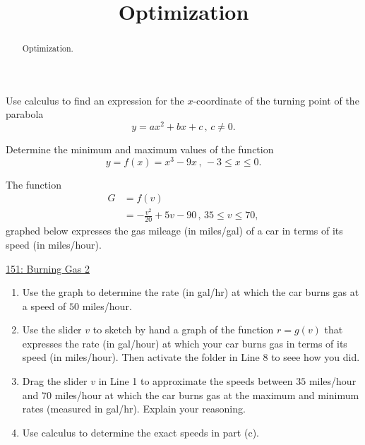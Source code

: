 \documentclass{ximera}
\title{Optimization}
\begin{document}
\begin{abstract}
Optimization.
\end{abstract}
\maketitle


\begin{question} \label{QOepREPER}
Use calculus to find an expression for the $x$-coordinate of the turning point of the parabola
\[
    y = ax^2 + bx + c \, , \, c\neq 0.
\]
\end{question}

\begin{question} \label{Q545hhghnnggZ}
Determine the minimum and maximum values of the function
\[
     y = f(x) = x^3 - 9x \, , \, -3\leq x \leq 0 .
\]
\end{question}

\begin{question} \label{Q5hdfhgeyghhg}
The function
\begin{align*}
    G  &= f(v)    \\
         &=  -\frac{v^2}{20} + 5v -90 \, , \, 35\leq v \leq 70 ,
\end{align*}
graphed below expresses the gas mileage (in miles/gal) of a car in terms of its speed (in miles/hour).

\begin{onlineOnly}
    \begin{center}
\end{center}
\end{onlineOnly}

\href{https://www.desmos.com/calculator/bcj0k1fymu}{151: Burning Gas 2}

\begin{enumerate}
\item Use the graph to determine the rate (in gal/hr) at which the car burns gas at a speed of $50$ miles/hour.

\item Use the slider $v$ to sketch by hand a graph of the function $r=g(v)$ that expresses the rate (in gal/hour) at which your car burns gas in terms of its speed (in miles/hour). Then activate the folder in Line 8 to seee how you did.

\item Drag the slider $v$ in Line 1 to approximate the speeds between $35$ miles/hour and $70$ miles/hour at which the car burns gas at the maximum and minimum rates (measured in gal/hr). Explain your reasoning.

\item Use calculus to determine the exact speeds in part (c). %

\end{enumerate}


\end{question}
\end{document}
